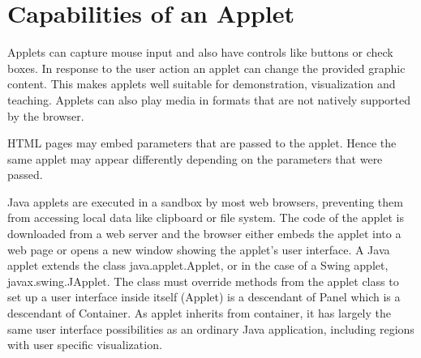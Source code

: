 
\section{Capabilities of an Applet}
Applets can capture mouse input and also have controls like buttons or check boxes. In response to the user action an applet can change the provided graphic content. This makes applets well suitable for demonstration, visualization and teaching. Applets can also play media in formats that are not natively supported by the browser.

HTML pages may embed parameters that are passed to the applet. Hence the same applet may appear differently depending on the parameters that were passed.

Java applets are executed in a sandbox by most web browsers, preventing them from accessing local data like clipboard or file system. The code of the applet is downloaded from a web server and the browser either embeds the applet into a web page or opens a new window showing the applet's user interface.
A Java applet extends the class java.applet.Applet, or in the case of a Swing applet, javax.swing.JApplet. The class must override methods from the applet class to set up a user interface inside itself (Applet) is a descendant of Panel which is a descendant of Container. As applet inherits from container, it has largely the same user interface possibilities as an ordinary Java application, including regions with user specific visualization.